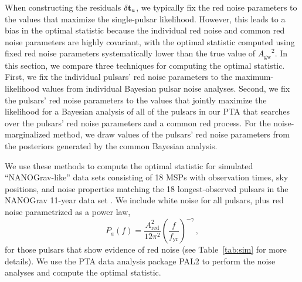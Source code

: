 \documentclass[twocolumn,aps,prd,superscriptaddress]{revtex4-1}
\newcommand{\Agw}{\ensuremath{A_\mathrm{gw}}}
\newcommand{\res}{\ensuremath{\delta {\bf t}}}
\begin{document}
When constructing the residuals $\res_a$, 
we typically fix the red noise parameters to the values that 
maximize the single-pulsar likelihood. 
However, this leads to a bias in the optimal statistic 
because the individual red noise and common red noise parameters 
are highly covariant, 
with the optimal statistic computed using fixed red noise parameters 
systematically lower than the true value of $\Agw^2$. 
In this section, we compare three techniques for computing the optimal statistic. 
First, we fix the individual pulsars' red noise parameters to the 
maximum-likelihood values from individual Bayesian pulsar noise analyses. 
Second, we fix the pulsars' red noise parameters to the 
values that jointly maximize the likelihood for a Bayesian analysis 
of all of the pulsars in our PTA 
that searches over the pulsars' red noise parameters and 
a common red process. 
For the noise-marginalized method, we draw values of the pulsars' 
red noise parameters from the posteriors generated by the common Bayesian analysis.

We use these methods to compute the optimal statistic 
for simulated ``NANOGrav-like'' data sets 
consisting of 18 MSPs with observation times, 
sky positions, and noise properties 
matching the 18 longest-observed pulsars in the 
NANOGrav 11-year data set \citep{abb+17}. 
We include white noise for all pulsars, plus 
red noise parametrized as a power law, 
\begin{equation}
	P_a(f) = \frac{A_\mathrm{red}^2}{12\pi^2} \left( \frac{f}{f_\mathrm{yr}} \right)^{-\gamma} \,,
\end{equation}
for those pulsars that show evidence of red noise 
(see Table~\ref{tab:sim} for more details).
We use the PTA data analysis package 
PAL2 %
\citep{evh17a}
to perform the noise analyses and compute the optimal statistic.
\end{document}
